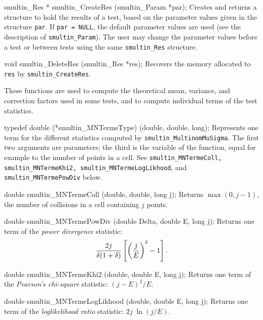 smultin_Res * smultin_CreateRes (smultin_Param *par);
\endcode
 \tab 
  Creates and returns a structure to hold the results of a test,
  based on the parameter values given in the structure {\tt par}.
  If {\tt par = NULL}, the default parameter values are used 
  (see the description of {\tt smultin\_Param}). The user may change
  the parameter values before a test or between tests using the same
  {\tt smultin\_Res} structure.
 \endtab
\code


void smultin_DeleteRes (smultin_Res *res);
\endcode
 \tab 
  Recovers the memory allocated to {\tt res} by {\tt smultin\_CreateRes}.
 \endtab




These functions are used to compute the theoretical mean, variance,
and correction factors used in some tests, and to compute individual terms
of the test statistics.

\code

typedef double (*smultin_MNTermeType) (double, double, long);
\endcode
  \tab Represents one term for the different
   statistics computed by {\tt smultin\_MultinomMuSigma}.
   The first two arguments are parameters;
   the third is  the variable of the function, equal for example to the
   number of points in a cell.  See {\tt smultin\_MNTermeColl,
   smultin\_MNTermeKhi2, smultin\_MNTermeLogLikhood}, and
   {\tt smultin\_MNTermePowDiv} below.
  \endtab
\code


double smultin_MNTermeColl (double, double, long j);
\endcode
 \tab Returns $\max(0, j-1)$, the number of collisions in a cell
  containing $j$ points.
 \endtab
\code


double smultin_MNTermePowDiv (double Delta, double E, long j);
\endcode
 \tab Returns one term of the {\sl power divergence} statistic:
  $${2j\over \delta(1+\delta)}
      \left[\left(j \over E\right)^\delta -1\right].$$
 \endtab
\code

double smultin_MNTermeKhi2 (double, double E, long j);
\endcode
 \tab Returns one term of the {\em Pearson's chi-square\/} statistic:
   $ (j - E)^2 / E$.
 \endtab
\code


double smultin_MNTermeLogLikhood (double, double E, long j);
\endcode
 \tab Returns one term of the {\em loglikelihood ratio\/} statistic:
    $ 2 j\; \ln \left(j / E\right)$.
 \endtab
\code


